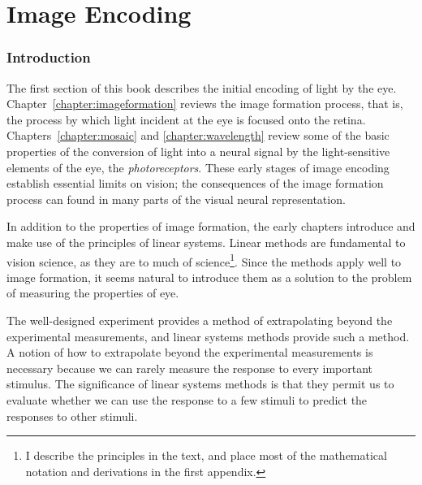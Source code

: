 
\part{Image Encoding}

\section*{Introduction}
The first section of this book
describes the initial encoding of light by the eye.
Chapter~\ref{chapter:imageformation} reviews the
image formation process, that is, the process
by which light incident at the eye is focused
onto the retina.
Chapters~\ref{chapter:mosaic} and \ref{chapter:wavelength}
review some of the basic properties of the conversion
of light into a neural signal by the light-sensitive
elements of the eye, the {\em photoreceptors}.
These early stages of image encoding
establish essential limits on vision;
the consequences of the image formation process
can found in many parts of the 
visual neural representation.

In addition to the properties of image formation,
the early chapters introduce and make
use of the principles of linear systems.
Linear methods are fundamental to vision science,
as they are to much of science\footnote{
I describe the principles in the text,
and place most of
the mathematical notation and derivations in the
first appendix.}.
Since the methods apply well to image formation,
it seems natural to introduce them as a solution
to the problem of measuring the properties of eye.

The well-designed experiment provides a
method of extrapolating beyond
the experimental measurements,
and linear systems methods provide such a method.
A notion of how to extrapolate
beyond the experimental measurements is necessary because
we can rarely measure the response to every important stimulus.
The significance of linear systems methods
is that they permit us to evaluate
whether we can use the
response to a few stimuli to predict the responses to other stimuli.

